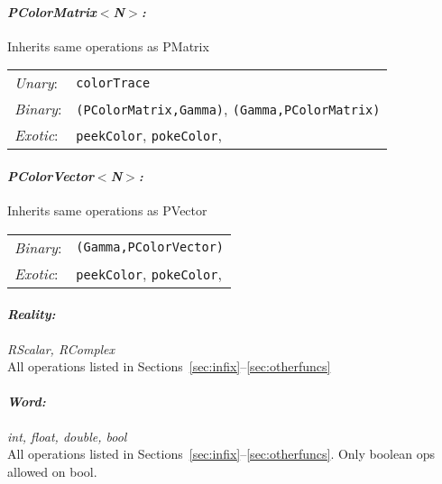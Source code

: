 \documentclass[12pt,letterpaper]{article}
\begin{document}
\paragraph{\bf\em PColorMatrix$<$N$>$:}
  Inherits same operations as PMatrix
\begin{flushleft}
  \begin{tabular}{lp{5.0in}}
  {\em Unary}:& {\tt colorTrace}\\
  {\em Binary}:& {\tt *(PColorMatrix,Gamma)}, {\tt *(Gamma,PColorMatrix)}\\
  {\em Exotic}:& {\tt peekColor}, {\tt pokeColor},\\
  \end{tabular}
\end{flushleft}

\paragraph{\bf\em PColorVector$<$N$>$:}
  Inherits same operations as PVector
\begin{flushleft}
  \begin{tabular}{lp{5.0in}}
  {\em Binary}:& {\tt *(Gamma,PColorVector)}\\
  {\em Exotic}:& {\tt peekColor}, {\tt pokeColor},\\
  \end{tabular}
\end{flushleft}


\paragraph{\bf\em Reality:} {\em RScalar, RComplex}\\
All operations listed in Sections~\ref{sec:infix}--\ref{sec:otherfuncs}

\paragraph{\bf\em Word:} {\em int, float, double, bool}\\
All operations listed in Sections~\ref{sec:infix}--\ref{sec:otherfuncs}.
Only boolean ops allowed on bool.

\newpage

\end{document}
